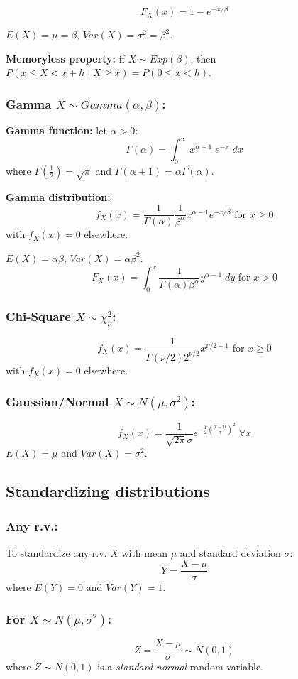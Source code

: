 \documentclass[15pt]{article}
\begin{document}
\[
    F_X (x) = 1 - e^{-x / \beta}
\]

$E(X) = \mu = \beta$, $Var(X) = \sigma^2 = \beta^2$.

\textbf{Memoryless property:} if $X \sim Exp(\beta)$, then $P(x \leq X < x+h \; | \; X \geq x) = P(0 \leq x < h)$.

\subsubsection{Gamma $X \sim Gamma(\alpha, \beta)$:}
\textbf{Gamma function:} let $\alpha > 0$:
\[
    \Gamma (\alpha) = \int_0^{\infty} x^{\alpha - 1} \; e^{-x} \; dx
\] where $\Gamma(\frac{1}{2}) = \sqrt{\pi}$ and $\Gamma(\alpha + 1) = \alpha \Gamma(\alpha)$.

\textbf{Gamma distribution:}
\[
    f_X (x) = \frac{1}{\Gamma (\alpha)} \frac{1}{\beta^{\alpha}} x^{\alpha - 1} e^{-x / \beta} \text{ for } x \geq 0
\] with $f_X (x) = 0$ elsewhere.

$E(X) = \alpha \beta$, $Var(X) = \alpha \beta^2$.
\[
    F_X (x) = \int_0^x \frac{1}{\Gamma (\alpha) \beta^{\alpha}} y^{\alpha - 1} \; dy \text{ for } x > 0
\]

\subsubsection{Chi-Square $X \sim \chi_{\nu}^2$:}
\[
    f_X (x) = \frac{1}{\Gamma (\nu / 2) 2^{\nu / 2}} x^{\nu / 2 - 1} \text{ for } x \geq 0
\] with $f_X (x) = 0$ elsewhere.

\subsubsection{Gaussian/Normal $X \sim N(\mu, \sigma^2)$:}
\[
    f_X (x) = \frac{1}{\sqrt{2 \pi} \sigma} e^{-\frac{1}{2} \left(\frac{x - \mu}{\sigma}\right)^2} \; \forall x
\]
$E(X) = \mu$ and $Var(X) = \sigma^2$.

\subsection{Standardizing distributions}
\subsubsection{Any r.v.:}
To standardize any r.v. $X$ with mean $\mu$ and standard deviation $\sigma$:
\[
    Y = \frac{X - \mu}{\sigma}
\]
where $E(Y) = 0$ and $Var(Y) = 1$. 

\subsubsection{For $X \sim N(\mu, \sigma^2)$:}
\[
    Z = \frac{X - \mu}{\sigma} \sim N(0,1)
\]
where $Z \sim N(0,1)$ is a \emph{standard normal} random variable.
\end{document}
